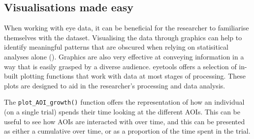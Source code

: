 \documentclass[
  man,
  floatsintext,
  longtable,
  nolmodern,
  notxfonts,
  notimes,
  colorlinks=true,linkcolor=blue,citecolor=blue,urlcolor=blue]{apa7}
\begin{document}
\subsection{Visualisations made easy}\label{visualisations-made-easy}

When working with eye data, it can be beneficial for the researcher to
familiarise themselves with the dataset. Visualising the data through
graphics can help to identify meaningful patterns that are obscured when
relying on statisitical analyses alone
().
Graphics are also very effective at conveying information in a way that
is easily grasped by a diverse audience. eyetools offers a selection of
in-built plotting functions that work with data at most stages of
processing. These plots are designed to aid in the researcher's
processing and data analysis.

The \texttt{plot\_AOI\_growth()} function offers the representation of
how an individual (on a single trial) spends their time looking at the
different AOIs. This can be useful to see how AOIs are interacted with
over time, and this can be presented as either a cumulative over time,
or as a proportion of the time spent in the trial.
\end{document}

